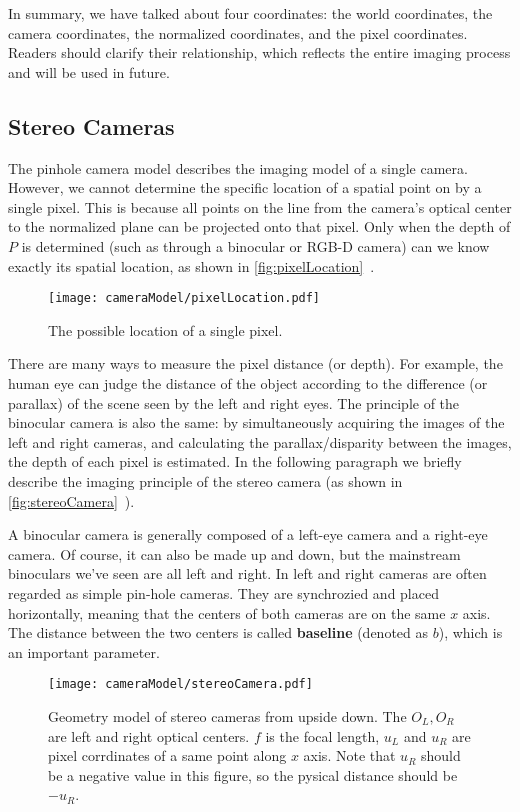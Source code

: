 In summary, we have talked about four coordinates: the world coordinates, the camera coordinates, the normalized coordinates, and the pixel coordinates. Readers should clarify their relationship, which reflects the entire imaging process and will be used in future.

\subsection{Stereo Cameras}
The pinhole camera model describes the imaging model of a single camera. However, we cannot determine the specific location of a spatial point on by a single pixel. This is because all points on the line from the camera's optical center to the normalized plane can be projected onto that pixel. Only when the depth of $P$ is determined (such as through a binocular or RGB-D camera) can we know exactly its spatial location, as shown in \autoref {fig:pixelLocation}~.

\begin{figure}[!ht]
    \centering
    \texttt{[image: cameraModel/pixelLocation.pdf]}
    \caption{The possible location of a single pixel.}
    \label{fig:pixelLocation}
\end{figure}

There are many ways to measure the pixel distance (or depth). For example, the human eye can judge the distance of the object according to the difference (or parallax) of the scene seen by the left and right eyes. The principle of the binocular camera is also the same: by simultaneously acquiring the images of the left and right cameras, and calculating the parallax/disparity between the images, the depth of each pixel is estimated. In the following paragraph we  briefly describe the imaging principle of the stereo camera (as shown in \autoref{fig:stereoCamera}~).

A binocular camera is generally composed of a left-eye camera and a right-eye camera. Of course, it can also be made up and down, but the mainstream binoculars we've seen are all left and right. In left and right cameras are often regarded as simple pin-hole cameras. They are synchrozied and placed horizontally, meaning that the centers of both cameras are on the same $x$ axis. The distance between the two centers is called \textbf {baseline} (denoted as $b$), which is an important parameter.

\begin{figure}[!ht]
    \centering
    \texttt{[image: cameraModel/stereoCamera.pdf]}
    \caption{Geometry model of stereo cameras from upside down. The $O_L,O_R$ are left and right optical centers. $f$ is the focal length, $u_L$ and $u_R$ are pixel corrdinates of a same point along $x$ axis. Note that $u_R$ should be a negative value in this figure, so the pysical distance should be $-u_R$.}
    \label{fig:stereoCamera}
\end{figure}


